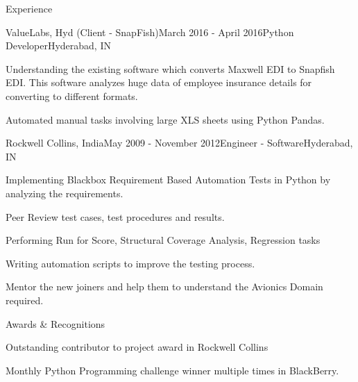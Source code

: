 \documentclass{resume}
\begin{document}
\begin{rSection}{Experience}
    \begin{rSubsection}{ValueLabs, Hyd (Client - SnapFish)}{March 2016 - April 2016}{Python Developer}{Hyderabad, IN}
    \item Understanding the existing software which converts Maxwell EDI to Snapfish EDI. This software analyzes huge data of employee insurance details for converting to different formats.
    \item Automated manual tasks involving large XLS sheets using Python Pandas.
    \end{rSubsection}
    
  
    \begin{rSubsection}{Rockwell Collins, India}{May 2009 - November 2012}{Engineer - Software}{Hyderabad, IN}
    \item Implementing Blackbox Requirement Based Automation Tests in Python by analyzing the requirements.
    \item Peer Review test cases, test procedures and results.
    \item Performing Run for Score, Structural Coverage Analysis, Regression tasks
    \item Writing automation scripts to improve the testing process.
    \item Mentor the new joiners and help them to understand the Avionics Domain required.
    \end{rSubsection}
  
  \end{rSection}
  
\begin{rSection}{Awards \& Recognitions }
    \begin{rSubsection}{}{}{}{}
    \item Outstanding contributor to project award in Rockwell Collins
    \item Monthly Python Programming challenge winner multiple times in BlackBerry.
    \end{rSubsection}
  \end{rSection}  
\end{document}
